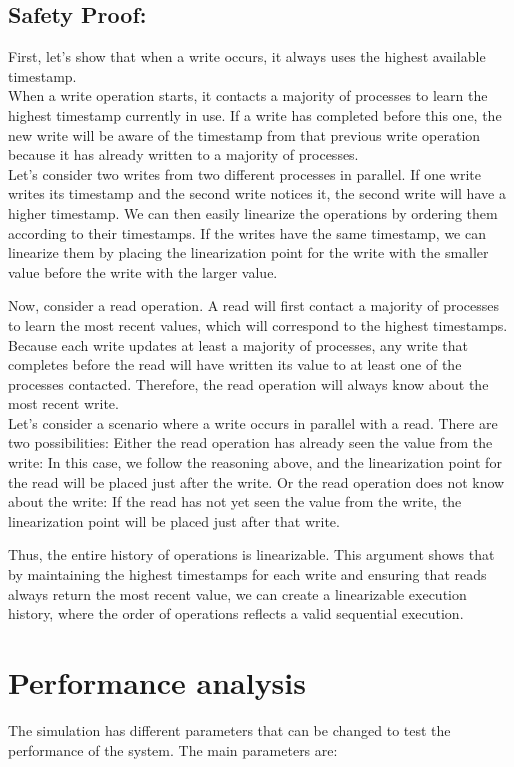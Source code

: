 \subsection{Safety Proof:}
First, let’s show that when a write occurs, it always uses the highest available timestamp. \\ When a write operation starts, it contacts a majority of processes to learn the highest timestamp currently in use. If a write has completed before this one, the new write will be aware of the timestamp from that previous write operation because it has already written to a majority of processes.
\\Let’s consider two writes from two different processes in parallel. If one write writes its timestamp and the second write notices it, the second write will have a higher timestamp. We can then easily linearize the operations by ordering them according to their timestamps. If the writes have the same timestamp, we can linearize them by placing the linearization point for the write with the smaller value before the write with the larger value.

\vspace{10pt}Now, consider a read operation. A read will first contact a majority of processes to learn the most recent values, which will correspond to the highest timestamps. Because each write updates at least a majority of processes, any write that completes before the read will have written its value to at least one of the processes contacted. Therefore, the read operation will always know about the most recent write. \\Let's consider a scenario where a write occurs in parallel with a read. There are two possibilities:
Either the read operation has already seen the value from the write: In this case, we follow the reasoning above, and the linearization point for the read will be placed just after the write.
Or the read operation does not know about the write: If the read has not yet seen the value from the write, the linearization point will be placed just after that write.

\vspace{10pt}Thus, the entire history of operations is linearizable. This argument shows that by maintaining the highest timestamps for each write and ensuring that reads always return the most recent value, we can create a linearizable execution history, where the order of operations reflects a valid sequential execution.

\newpage
\section{Performance analysis}
The simulation has different parameters that can be changed to test the performance of the system. The main parameters are:

